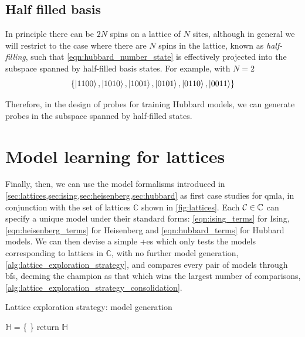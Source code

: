 \subsection{Half filled basis}
In principle there can be $2N$ spins on a lattice of $N$ sites, 
    although in general we will restrict to the case where there are $N$ spins in the lattice, 
    known as \emph{half-filling}, such that \cref{eqn:hubbard_number_state} is effectively projected into the subspace 
    spanned by half-filled basis states. 
For example, with $N=2$
\begin{equation}
    \label{eqn:hubbard_half_filled_basis_states}
    \{
        \ket{ 1100 }, \ket{ 1010 }, \ket{ 1001 }, 
        \ket{ 0101 }, \ket{ 0110 }, \ket{ 0011 }
    \}
\end{equation}

Therefore, in the design of probes for training Hubbard models, 
    we can generate probes in the subspace spanned by half-filled states. 

\section{Model learning for lattices}
Finally, then, we can use the model formalisms introduced in \cref{sec:lattices,sec:ising,sec:heisenberg,sec:hubbard}
    as first case studies for \gls{qmla}, in conjunction with the set of lattices $\mathbb{C}$ shown in \cref{fig:lattices}. 
Each ${ \mathcal{C}} \in \mathbb{C}$ can specify a unique model under their standard forms:
    \cref{eqn:ising_terms} for Ising, \cref{eqn:heisenberg_terms} for Heisenberg 
    and \cref{eqn:hubbard_terms} for Hubbard models.     
We can then devise a simple \glsxtrfull+{es} which only tests the models corresponding to lattices in $\mathbb{C}$, 
    with no further model generation, \cref{alg:lattice_exploration_strategy}, 
    and compares every pair of models through \glspl{bf}, 
    deeming the champion as that which wins the largest number of comparisons, 
    \cref{alg:lattice_exploration_strategy_consolidation}.

\begin{algorithm}
    \caption{Lattice exploration strategy: model generation}
    \label{alg:lattice_exploration_strategy}
    \DontPrintSemicolon

    \;

    $\mathbb{H}$ = \{ \}\;
    return $\mathbb{H}$
\end{algorithm}

